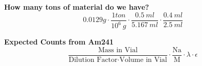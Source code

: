 \documentclass[idxtotoc,hyperref,openany,oneside]{labbook} %
\begin{document}
\textbf{How many tons of material do we have?}
\begin{equation*}
0.0129g\cdot\frac{1ton}{10^6\ g}\cdot\frac{0.5\ ml}{5.167\ ml}\cdot\frac{0.4\ ml}{2.5\ ml}
\end{equation*}




\textbf{Expected Counts from Am241}
\begin{equation*}
  \frac{\text{Mass in Vial}}{\text{Dilution Factor}\cdot\text{Volume in Vial}}\cdot
  \frac{\text{Na}}{\text{M}}\cdot\lambda\cdot\epsilon
\end{equation*}






\end{document}
